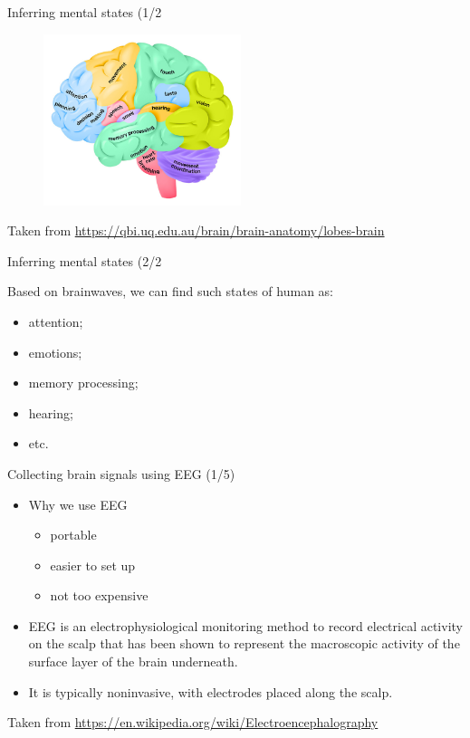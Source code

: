 \documentclass{beamer}
\begin{document}
\begin{frame}
{\centerline{Inferring mental states (1/2}}
    \begin{figure}
        \centering
        \includegraphics[height=5cm]{P2023.AIBCCSS.BrainSignals/Lobes-of-the-brain-QBI.jpg}
    \end{figure}
    \begin{center}
        \tiny{Taken from \url{https://qbi.uq.edu.au/brain/brain-anatomy/lobes-brain}}
    \end{center}
\end{frame}

\begin{frame}
{\centerline{Inferring mental states (2/2}}
    Based on brainwaves, we can find such states of human as:
    \begin{itemize}
        \item attention;
        \item emotions;
        \item memory processing;
        \item hearing;
        \item etc.
    \end{itemize}
\end{frame}

\begin{frame}
{\centerline{Collecting brain signals using EEG (1/5)}}
    \begin{itemize}
        \item Why we use EEG
     \begin{itemize}
         \item portable
         \item easier to set up
         \item not too expensive
     \end{itemize}
     \item EEG is an electrophysiological monitoring method to record electrical activity on the scalp that has been shown to represent the macroscopic activity of the surface layer of the brain underneath. 
     \item It is typically noninvasive, with electrodes placed along the scalp.
    \end{itemize}
     \begin{center}
         \tiny{Taken from \url{https://en.wikipedia.org/wiki/Electroencephalography}}
     \end{center}
\end{frame}
\end{document}
